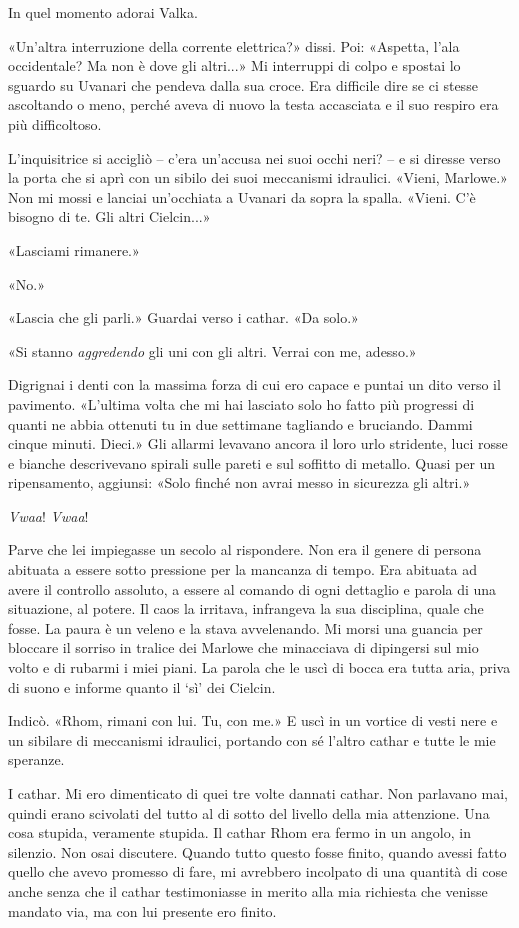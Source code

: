 In quel momento adorai Valka.

«Un'altra interruzione della corrente elettrica?» dissi. Poi: «Aspetta,
l'ala occidentale? Ma non è dove gli altri...» Mi interruppi di colpo e
spostai lo sguardo su Uvanari che pendeva dalla sua croce. Era difficile
dire se ci stesse ascoltando o meno, perché aveva di nuovo la testa
accasciata e il suo respiro era più difficoltoso.

L'inquisitrice si accigliò -- c'era un'accusa nei suoi occhi neri? -- e
si diresse verso la porta che si aprì con un sibilo dei suoi meccanismi
idraulici. «Vieni, Marlowe.» Non mi mossi e lanciai un'occhiata a
Uvanari da sopra la spalla. «Vieni. C'è bisogno di te. Gli altri
Cielcin...»

«Lasciami rimanere.»

«No.»

«Lascia che gli parli.» Guardai verso i cathar. «Da solo.»

«Si stanno \emph{aggredendo} gli uni con gli altri. Verrai con me,
adesso.»

Digrignai i denti con la massima forza di cui ero capace e puntai un
dito verso il pavimento. «L'ultima volta che mi hai lasciato solo ho
fatto più progressi di quanti ne abbia ottenuti tu in due settimane
tagliando e bruciando. Dammi cinque minuti. Dieci.» Gli allarmi levavano
ancora il loro urlo stridente, luci rosse e bianche descrivevano spirali
sulle pareti e sul soffitto di metallo. Quasi per un ripensamento,
aggiunsi: «Solo finché non avrai messo in sicurezza gli altri.»

\emph{Vwaa}! \emph{Vwaa}!

Parve che lei impiegasse un secolo al rispondere. Non era il genere di
persona abituata a essere sotto pressione per la mancanza di tempo. Era
abituata ad avere il controllo assoluto, a essere al comando di ogni
dettaglio e parola di una situazione, al potere. Il caos la irritava,
infrangeva la sua disciplina, quale che fosse. La paura è un veleno e la
stava avvelenando. Mi morsi una guancia per bloccare il sorriso in
tralice dei Marlowe che minacciava di dipingersi sul mio volto e di
rubarmi i miei piani. La parola che le uscì di bocca era tutta aria,
priva di suono e informe quanto il `sì' dei Cielcin.

Indicò. «Rhom, rimani con lui. Tu, con me.» E uscì in un vortice di
vesti nere e un sibilare di meccanismi idraulici, portando con sé
l'altro cathar e tutte le mie speranze.

I cathar. Mi ero dimenticato di quei tre volte dannati cathar. Non
parlavano mai, quindi erano scivolati del tutto al di sotto del livello
della mia attenzione. Una cosa stupida, veramente stupida. Il cathar
Rhom era fermo in un angolo, in silenzio. Non osai discutere. Quando
tutto questo fosse finito, quando avessi fatto quello che avevo promesso
di fare, mi avrebbero incolpato di una quantità di cose anche senza che
il cathar testimoniasse in merito alla mia richiesta che venisse mandato
via, ma con lui presente ero finito.

